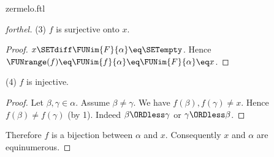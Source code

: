 \documentclass{naproche-library}
\begin{document}
\begin{smodule}[title=Zermelo's Well-Ordering Theorem]{zermelo.ftl}
\begin{proof}[forthel]
  (3) $f$ is surjective onto $x$.
  \begin{proof}
    $x \SETdiff \FUNim{F}{\alpha} \eq \SETempty$.
    Hence $\FUNrange(f)
      \eq \FUNim{f}{\alpha}
      \eq \FUNim{F}{\alpha}
      \eq x$.
  \end{proof}

  (4) $f$ is injective.
  \begin{proof}
    Let $\beta, \gamma \in \alpha$.
    Assume $\beta \neq \gamma$.
    We have $f(\beta), f(\gamma) \neq x$.
    Hence $f(\beta) \neq f(\gamma)$ (by 1).
    Indeed $\beta \ORDless \gamma$ or $\gamma \ORDless \beta$.
  \end{proof}

  Therefore $f$ is a bijection between $\alpha$ and $x$.
  Consequently $x$ and $\alpha$ are equinumerous.
\end{proof}
\end{smodule}
\end{document}
